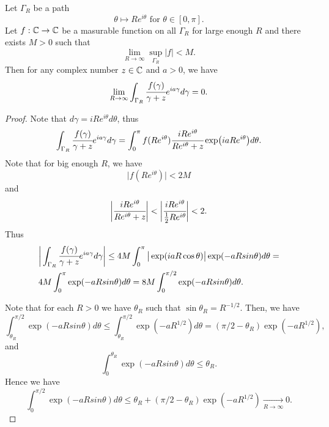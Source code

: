 \documentclass[main.tex]{subfiles}
\begin{document}
\begin{lemma}
Let $\Gamma_R$ be a path
\begin{equation}
\theta \mapsto Re^{i\theta} \text{ for } \theta\in[0, \pi].
\end{equation}
Let $f:\mathbb{C} \to \mathbb{C}$ be a masurable function on all $\Gamma_R$ for large enough $R$ and there exists $M > 0$ such that
\begin{equation}
\lim_{R\to\infty} \sup_{\Gamma_R} |f| < M.
\end{equation}
Then for any complex number $z\in \mathbb{C}$ and $a > 0$, we have
\begin{equation}
\lim_{R\to \infty} \int_{\Gamma_R} \cfrac{f(\gamma)}{\gamma + z}e^{ia\gamma}d\gamma = 0.
\end{equation} 
\end{lemma}
\begin{proof}
Note that $d\gamma = iRe^{i\theta} d\theta$, thus
\begin{equation}
\int_{\Gamma_R} \cfrac{f(\gamma)}{\gamma + z}e^{ia\gamma}d\gamma =
\int_0^\pi f(Re^{i\theta}) \cfrac{iRe^{i\theta}}{Re^{i\theta} + z} \exp(iaRe^{i\theta})d\theta.
\end{equation}
Note that for big enough $R$, we have
\begin{equation}
\big| f(Re^{i\theta})\big| < 2M
\end{equation}
and 
\begin{equation}
\bigg|  \cfrac{iRe^{i\theta}}{Re^{i\theta} + z} \bigg| < \bigg|  \cfrac{iRe^{i\theta}}{\frac{1}{2}Re^{i\theta}} \bigg| < 2.
\end{equation}
Thus
\begin{align*}
& \bigg| \int_{\Gamma_R} \cfrac{f(\gamma)}{\gamma + z}e^{ia\gamma}d\gamma \bigg| \leq
4M \int_0^\pi \big| \exp(iaR\cos\theta)\big| \exp(-aRsin\theta) d \theta = \\
& 4M \int_0^\pi \exp(-aRsin\theta) d \theta = 8M \int_0^{\pi/2} \exp(-aRsin\theta) d \theta.
\end{align*}

Note that for each $R > 0$ we have $\theta_R$ such that $\sin \theta_R = R^{-1/2}$.
Then, we have
\begin{equation}
\int_{\theta_R}^{\pi/2} \exp(-aRsin\theta) d \theta \leq \int_{\theta_R}^{\pi/2} \exp(-aR^{1/2}) d \theta = (\pi/2 - \theta_R) \exp(-aR^{1/2}),
\end{equation}
and
\begin{equation}
\int_0^{\theta_R} \exp(-aRsin\theta) d \theta \leq \theta_R.
\end{equation}
Hence we have
\begin{equation}
\int_0^{\pi/2} \exp(-aRsin\theta) d \theta \leq \theta_R + (\pi/2 - \theta_R) \exp(-aR^{1/2}) \xrightarrow[R \to \infty]{} 0.
\end{equation} 
\end{proof}
\end{document}
